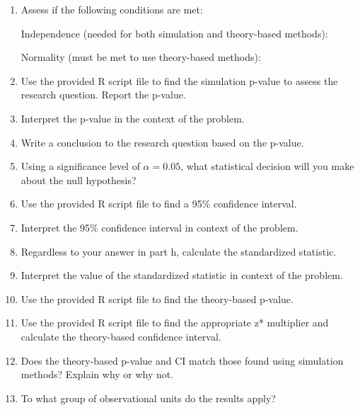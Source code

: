 \documentclass[
]{report}
\begin{document}
\begin{enumerate}
\def\labelenumi{\alph{enumi}.}
\setcounter{enumi}{7}
\item
  Assess if the following conditions are met:

  Independence (needed for both simulation and theory-based methods):
  \vspace{0.5in}

  Normality (must be met to use theory-based methods):
  \vspace{0.6in}
\item
  Use the provided R script file to find the simulation p-value to assess the research question. Report the p-value.
  \vspace{0.2in}
\item
  Interpret the p-value in the context of the problem.
  \vspace{0.7in}
\item
  Write a conclusion to the research question based on the p-value.
  \vspace{0.7in}
\item
  Using a significance level of \(\alpha = 0.05\), what statistical decision will you make about the null hypothesis?
  \vspace{0.3in}
\item
  Use the provided R script file to find a 95\% confidence interval.
  \vspace{0.3in}
\item
  Interpret the 95\% confidence interval in context of the problem.
  \vspace{0.7in}
\item
  Regardless to your answer in part h, calculate the standardized statistic.
  \vspace{0.4in}
\item
  Interpret the value of the standardized statistic in context of the problem.
  \vspace{0.7in}
\item
  Use the provided R script file to find the theory-based p-value.
  \vspace{0.3in}
\item
  Use the provided R script file to find the appropriate z* multiplier and calculate the theory-based confidence interval.
  \vspace{0.5in}
\item
  Does the theory-based p-value and CI match those found using simulation methods? Explain why or why not.
  \vspace{0.7in}
\item
  To what group of observational units do the results apply?
  \vspace{0.8in}
\end{enumerate}
\end{document}
